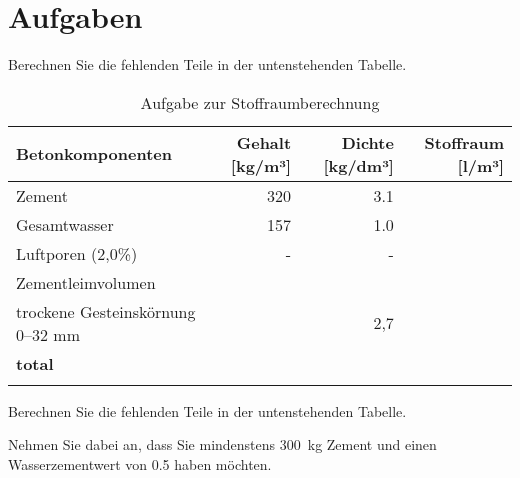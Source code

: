 \section*{Aufgaben}
\begin{questions}
    \question Berechnen Sie die fehlenden Teile in der untenstehenden Tabelle.
    \begin{table}[h]
        \centering
        \caption{Aufgabe zur Stoffraumberechnung}
        \begin{tabular}{lrrr}
        \toprule
        \textbf{Betonkomponenten}       & \textbf{Gehalt [kg/m³]} & \textbf{Dichte [kg/dm³]} & \textbf{Stoffraum [l/m³]} \\ 
        \midrule
        Zement                           & 320                      & 3.1                       &    {}          \\
        Gesamtwasser                     & 157                      & 1.0                       & {}            \\
        Luftporen (2,0\%)                & -                        & -                         & {}              \\
        Zementleimvolumen                &                          &                           &                           \\
        trockene Gesteinskörnung 0–32 mm & {}                     & 2,7                       & {}             \\
        \textbf{total}                   & {}           &            {}               & {}             \\
        \bottomrule
        \label{tab:Stoffraumberechnung}
        \end{tabular}
        \end{table}


        \question Berechnen Sie die fehlenden Teile in der untenstehenden Tabelle.

        Nehmen Sie dabei an, dass Sie mindenstens \SI{300}{\kg} Zement und einen Wasserzementwert von 0.5 haben möchten.


\end{questions}
